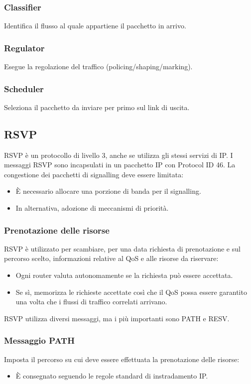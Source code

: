 \subsubsection{Classifier}
Identifica il flusso al quale appartiene il pacchetto in arrivo.

\subsubsection{Regulator}
Esegue la regolazione del traffico (policing/shaping/marking).

\subsubsection{Scheduler}
Seleziona il pacchetto da inviare per primo sul link di uscita.

\subsection{RSVP}
RSVP è un protocollo di livello 3, anche se utilizza gli stessi servizi di IP. I messaggi RSVP sono incapsulati in un pacchetto IP con Protocol ID 46. La congestione dei pacchetti di signalling deve essere limitata:
\begin{itemize}
	\item È necessario allocare una porzione di banda per il signalling.
	\item In alternativa, adozione di meccanismi di priorità.
\end{itemize}

\subsubsection{Prenotazione delle risorse}
RSVP è utilizzato per scambiare, per una data richiesta di prenotazione e sul percorso scelto, informazioni relative al QoS e alle risorse da riservare:
\begin{itemize}
	\item Ogni router valuta autonomamente se la richiesta può essere accettata.
	\item Se sì, memorizza le richieste accettate così che il QoS possa essere garantito una volta che i flussi di traffico correlati arrivano.
\end{itemize}

RSVP utilizza diversi messaggi, ma i più importanti sono PATH e RESV.

\subsubsection{Messaggio PATH}
Imposta il percorso su cui deve essere effettuata la prenotazione delle risorse:
\begin{itemize}
	\item È consegnato seguendo le regole standard di instradamento IP.
\end{itemize}

